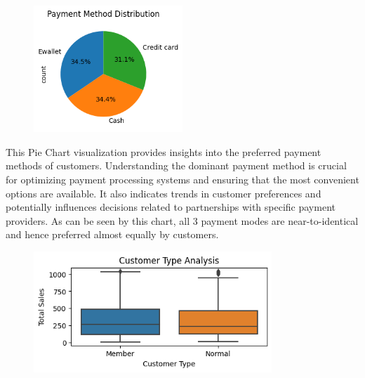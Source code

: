 

\begin{figure}[h]
    \centering
    \includegraphics[width=0.5\textwidth]{Chapters/ch1/ch_1_pie_chart_1.png}
\end{figure}
 This Pie Chart visualization provides insights into the preferred payment methods of customers. Understanding the dominant payment method is crucial for optimizing payment processing systems and ensuring that the most convenient options are available. It also indicates trends in customer preferences and potentially influences decisions related to partnerships with specific payment providers. As can be seen by this chart, all 3 payment modes are near-to-identical and hence preferred almost equally by customers.


\begin{figure}[h]
    \centering
    \includegraphics[width=0.8\textwidth]{Chapters/ch1/ch_1_box_plot_1.png}
\end{figure}

